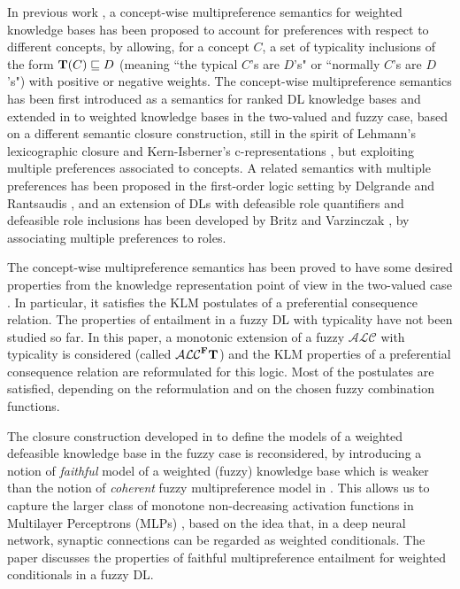 \documentclass[runningheads]{llncs}
\newcommand{\tip}{{\bf T}}
\newcommand{\alc}{\mathcal{ALC}}
\newcommand{\alcFt}{\mathcal{ALC}^{\Fe}\tip}
\newcommand {\Fe} {{\bf F}}
\begin{document}
In previous work \cite{JELIA2021}, a concept-wise multipreference semantics 
for weighted knowledge bases has been proposed to account for preferences with respect to different concepts, 
by allowing, for a concept $C$, a set of typicality inclusions of the form $\tip(C) \sqsubseteq D$ (meaning ``the typical $C$'s are $D$'s" or ``normally $C$'s are $D$'s") with positive or negative weights. 
The concept-wise multipreference semantics  
has been first introduced  as a semantics for ranked DL knowledge bases  \cite{iclp2020} and extended in   \cite{JELIA2021} to  weighted knowledge bases in the two-valued and fuzzy case, based on a different semantic closure construction, 
still in the spirit of Lehmann's lexicographic closure \cite{whatdoes} and Kern-Isberner's c-representations  \cite{Kern-Isberner01,Kern-Isberner2014}, but exploiting multiple preferences associated to concepts.
A related semantics with multiple preferences has been proposed in the first-order logic setting by Delgrande and Rantsaudis \cite{Delgrande2020}, and an extension of DLs with defeasible role quantifiers and defeasible role inclusions has been developed by Britz and Varzinczak \cite{Britz2018,Britz2019}, by associating multiple  preferences to roles.


The concept-wise multipreference semantics 
has been proved to have some desired properties from the knowledge representation point of view in the two-valued case \cite{iclp2020}. In particular, it satisfies the KLM postulates of a preferential consequence relation. 
The properties 
of entailment in a fuzzy DL with typicality have not been studied so far. In this paper, 
a monotonic extension of a fuzzy $\alc$ with typicality is considered (called $\alcFt$) and the KLM properties of a preferential consequence relation are reformulated for this logic. Most of the postulates are satisfied, depending on the reformulation and on the chosen fuzzy combination functions.

The closure construction developed in \cite{JELIA2021} to define the models of a weighted defeasible knowledge base in the fuzzy case is reconsidered, 
by introducing a notion of {\em faithful} model of a weighted (fuzzy) knowledge base which is weaker than the notion of {\em coherent} fuzzy multipreference model in  \cite{JELIA2021}.  This allows us to capture the larger class of monotone non-decreasing activation functions in Multilayer Perceptrons (MLPs) \cite{Haykin99},
based on the idea that, in a deep neural network,  synaptic connections can be regarded as weighted conditionals.
The paper discusses the properties of faithful multipreference entailment for weighted conditionals in a fuzzy DL. 
\end{document}
